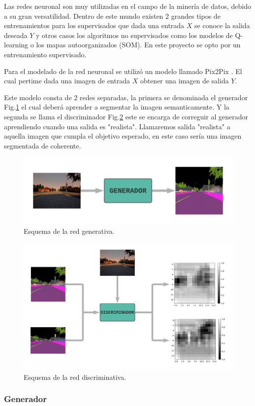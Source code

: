\documentclass[]{IEEEtran}
\begin{document}
    Las redes neuronal son muy utilizadas en el campo de la minería de datos, debido a 
    su gran versatilidad. Dentro de este mundo existen 2 grandes tipos de entrenamientos 
    para los supervisados que dada una entrada $X$ se conoce la salida deseada $Y$ y 
    otros casos los algoritmos no supervisados como los modelos de Q-learning o los mapas autoorganizados (SOM).
    En este proyecto se opto por un entrenamiento supervisado.

    

    Para el modelado de la red neuronal se utilizó un modelo llamado Pix2Pix \cite{Pix2Pix}.
    El cual pertime dada una imagen de entrada $X$ obtener una imagen de salida $Y$.

    Este modelo consta de $2$ redes separadas, la primera se denominada el generador Fig.\ref{fig:generator}
    el cual deberá aprender a segmentar la imagen semanticamente. Y la segunda se llama el discriminador Fig.\ref{fig:discr}
    este se encarga de correguir al generador aprendiendo cuando una salida es "realista". 
    Llamaremos salida "realista" a aquella imagen que cumpla el objetivo esperado, en este caso sería una imagen segmentada 
    de coherente.
    
    \begin{figure}
        \centering
        \includegraphics[width=.4\textwidth]{Imgs/Generador.png}
        \caption{Esquema de la red generativa.}
        \label{fig:generator}
    \end{figure}

    \begin{figure}
        \centering
        \includegraphics[width=.4\textwidth]{Imgs/Discriminador.png}
        \caption{Esquema de la red discriminativa.}
        \label{fig:discr}
    \end{figure}
    


    \subsubsection{Generador}
\end{document}
